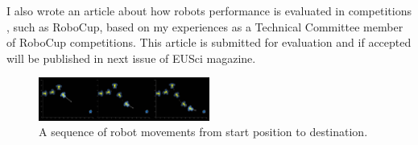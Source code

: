 \documentclass[conference,12pt]{IEEEtran}
\begin{document}
I also wrote an article about how robots performance is evaluated in competitions , such as RoboCup, based on my experiences as a Technical Committee member of RoboCup competitions. This article is submitted for evaluation and if accepted will be published in next issue of EUSci magazine.
\begin{figure}[!bp]
\begin{center}
\includegraphics[width=0.5\textwidth] {Seq2.png}
\caption{A sequence of robot movements from start position to destination.}
\end{center}
\end{figure}



%
%



%
%
\end{document}
